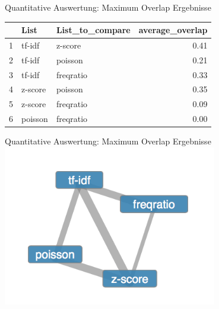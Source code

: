 \documentclass{beamer}
\begin{document}
\begin{frame}{Quantitative Auswertung: Maximum Overlap Ergebnisse}
\begin{table}[ht]
\centering
\begin{tabular}{rllr}
  \hline
 & List & List\_to\_compare & average\_overlap \\ 
  \hline
1 & tf-idf & z-score & 0.41 \\ 
  2 & tf-idf & poisson & 0.21 \\ 
  3 & tf-idf & freqratio & 0.33 \\ 
  4 & z-score & poisson & 0.35 \\ 
  5 & z-score & freqratio & 0.09 \\ 
  6 & poisson & freqratio & 0.00 \\ 
   \hline
\end{tabular}
\label{AvarageOverlapComparison}
\end{table}
\end{frame}

\begin{frame}{Quantitative Auswertung: Maximum Overlap Ergebnisse}
	  \centering
	  \includegraphics[width=0.7\textwidth]{pictures/measureCompare.png}
	  
\end{frame}
\end{document}
